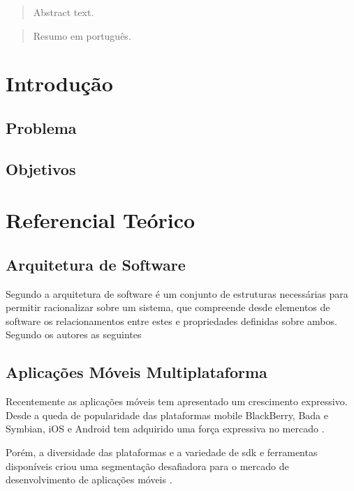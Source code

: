 \documentclass[
	article,			%
	11pt,				%
	oneside,			%
	a4paper,			%
	english,			%
	brazil,				%
	sumario=tradicional
]{abntex2}
\begin{document}
\maketitle

\begin{abstract}
Abstract text.
\end{abstract}


\begin{abstract}
Resumo em português.
\end{abstract}

\tableofcontents

\chapter{Introdução}
\section{Problema}
\section{Objetivos}
\chapter{Referencial Teórico}
\section{Arquitetura de Software}

Segundo \cite{bass2012practice} a arquitetura de software é um conjunto de estruturas necessárias para permitir racionalizar sobre um sistema, que compreende desde elementos de software os relacionamentos entre estes e propriedades definidas sobre ambos. Segundo os autores as seguintes 



\section{Aplicações Móveis Multiplataforma}
Recentemente as aplicações móveis tem apresentado um crescimento expressivo. Desde a queda de popularidade das plataformas mobile BlackBerry, Bada e Symbian, iOS e Android tem adquirido uma força expressiva no mercado \cite{dalmasso2013survey}.

Porém, a diversidade das plataformas e a variedade de \gls{sdk} e ferramentas disponíveis criou uma segmentação desafiadora para o mercado de desenvolvimento de aplicações móveis \cite{dalmasso2013survey}.
\end{document}
